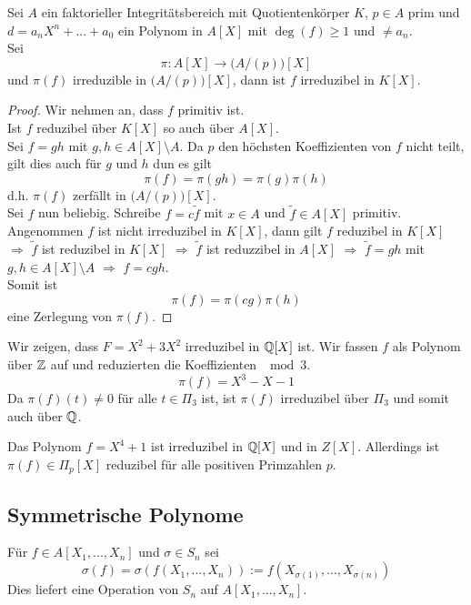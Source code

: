 	\begin{satz}[Reduktionskriterium]
		Sei $A$ ein faktorieller  Integritätsbereich mit Quotientenkörper $K$, $p\in A$ prim und $d=a_nX^n+...+a_0$ ein Polynom in $A[X]$ mit $\deg(f)\geq 1$ und $\neq a_n$.\\
		Sei
		\[\pi:A[X]\to\big(A/(p)\big)[X]\]
		und $\pi(f)$ irreduzible in $\big(A/(p)\big)[X]$, dann ist $f$ irreduzibel in $K[X]$.
	\end{satz}
	\begin{proof}
		Wir nehmen an, dass $f$ primitiv ist.\\
		Ist $f$ reduzibel über $K[X]$ so auch über $A[X]$.\\
		Sei $f=gh$ mit $g,h\in A[X]\setminus A$. Da $p$ den höchsten Koeffizienten von $f$ nicht teilt, gilt dies auch für $g$ und $h$ dun es gilt
		\[\pi(f)=\pi(gh)=\pi(g)\pi(h)\]
		d.h. $\pi(f)$ zerfällt in $\big(A/(p)\big)[X]$.\\
		Sei $f$ nun beliebig. Schreibe $f=c\tilde f$ mit $x\in A$ und $\tilde f\in A[X]$ primitiv.\\
		Angenommen $f$ ist nicht irreduzibel in $K[X]$, dann gilt $f$ reduzibel in $K[X]$ $\Rightarrow$ $\tilde f$ ist reduzibel in $K[X]$ $\Rightarrow $ $\tilde f$ ist reduzzibel in $A[X]$ $\Rightarrow$ $\tilde f=gh$ mit $g,h\in A[X]\setminus A$ $\Rightarrow$ $f=cgh$.\\
		Somit ist
		\[\pi(f)=\pi(cg)\pi(h)\]
		eine Zerlegung von $\pi(f)$.
	\end{proof}

	\begin{exmlist}
		\begin{exm}
			Wir zeigen, dass $F=X^2+3X^2$ irreduzibel in $\mathbb{Q}[X]$ ist. Wir fassen $f$ als Polynom über $\mathbb{Z}$ auf und reduzierten die Koeffizienten $\mod 3$.\[\pi(f)=X^3-X-1\]
			Da $\pi(f)(t)\neq 0$ für alle $t\in\Pi_3$ ist, ist $\pi(f)$ irreduzibel über $\Pi_3$ und somit auch über $\mathbb{Q}$.
		\end{exm}
		\begin{exm}
			Das Polynom $f=X^4+1$ ist irreduzibel in $\mathbb{Q}[X]$ und in $Z[X]$. Allerdings ist $\pi(f)\in\Pi_p[X]$ reduzibel für alle positiven Primzahlen $p$.
		\end{exm}
	\end{exmlist}

	\subsection{Symmetrische Polynome}
	\begin{definition}
		Für $f\in A[X_1,...,X_n]$ und $\sigma\in S_n$ sei
		\[\sigma(f)=\sigma(f(X_1,...,X_n)):=f(X_{\sigma(1)},...,X_{\sigma(n)})\]
		Dies liefert eine Operation von $S_n$ auf $A[X_1,...,X_n]$.\\
	\end{definition}

